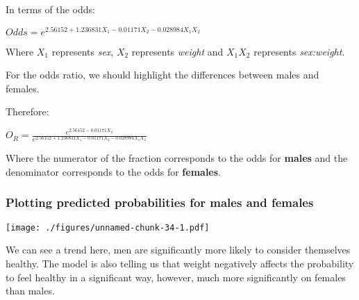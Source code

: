 \documentclass[]{article}
\newenvironment{Shaded}{\begin{snugshade}}{\end{snugshade}}
\newcommand{\DataTypeTok}[1]{\textcolor[rgb]{0.13,0.29,0.53}{#1}}
\newcommand{\DecValTok}[1]{\textcolor[rgb]{0.00,0.00,0.81}{#1}}
\newcommand{\KeywordTok}[1]{\textcolor[rgb]{0.13,0.29,0.53}{\textbf{#1}}}
\newcommand{\NormalTok}[1]{#1}
\newcommand{\OperatorTok}[1]{\textcolor[rgb]{0.81,0.36,0.00}{\textbf{#1}}}
\newcommand{\StringTok}[1]{\textcolor[rgb]{0.31,0.60,0.02}{#1}}
\begin{document}
In terms of the odds:

\(Odds = e^{2.56152 + 1.236831 X_1 - 0.01171 X_2 - 0.028984 X_1 X_2}\)

Where \(X_1\) represents \emph{sex}, \(X_2\) represents \emph{weight}
and \(X_1 X_2\) represents \emph{sex:weight}.

For the odds ratio, we should highlight the differences between males
and females.

Therefore:

\(O_R = \frac{e^{2.56152 - 0.01171 X_2}}{e^{2.56152 + 1.236831 X_1 - 0.01171 X_2 - 0.028984 X_1 X_2}}\)

Where the numerator of the fraction corresponds to the odds for
\textbf{males} and the denominator corresponds to the odds for
\textbf{females}.

\hypertarget{plotting-predicted-probabilities-for-males-and-females}{%
\subsubsection{Plotting predicted probabilities for males and
females}\label{plotting-predicted-probabilities-for-males-and-females}}

\begin{Shaded}
\end{Shaded}

\texttt{[image: ./figures/unnamed-chunk-34-1.pdf]}

We can see a trend here, men are significantly more likely to consider
themselves healthy. The model is also telling us that weight negatively
affects the probability to feel healthy in a significant way, however,
much more significantly on females than males.
\end{document}
